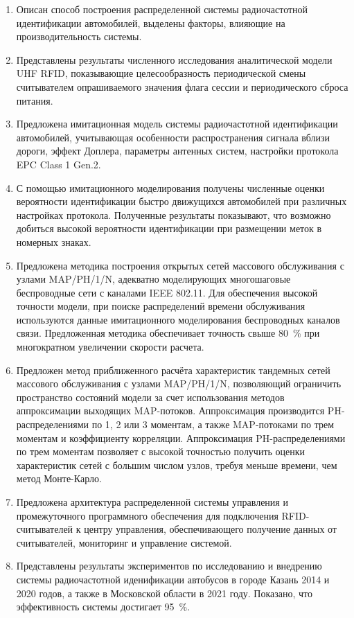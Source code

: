 \begin{enumerate}
  \item Описан способ построения распределенной системы радиочастотной идентификации автомобилей, выделены факторы, влияющие на производительность системы.
  \item Представлены результаты численного исследования аналитической модели UHF RFID, показывающие целесообразность периодической смены считывателем опрашиваемого значения флага сессии и периодического сброса питания.
  \item Предложена имитационная модель системы радиочастотной идентификации автомобилей, учитывающая особенности распространения сигнала вблизи дороги, эффект Доплера, параметры антенных систем, настройки протокола EPC Class 1 Gen.2.
  \item С помощью имитационного моделирования получены численные оценки вероятности идентификации быстро движущихся автомобилей при различных настройках протокола. Полученные результаты показывают, что возможно добиться высокой вероятности идентификации при размещении меток в номерных знаках.
  \item Предложена методика построения открытых сетей массового обслуживания с узлами MAP/PH/1/N, адекватно моделирующих многошаговые беспроводные сети с каналами IEEE 802.11. Для обеспечения высокой точности модели, при поиске распределений времени обслуживания используются данные имитационного моделирования беспроводных каналов связи. Предложенная методика обеспечивает точность свыше 80~\% при многократном увеличении скорости расчета.
  \item Предложен метод приближенного расчёта характеристик тандемных сетей массового обслуживания с узлами MAP/PH/1/N,   позволяющий ограничить пространство состояний модели за счет использования методов аппроксимации выходящих MAP-потоков. Аппроксимация производится PH-распределениями по 1, 2 или 3 моментам, а также MAP-потоками по трем моментам и коэффициенту корреляции. Аппроксимация PH-распределениями по трем моментам позволяет с высокой точностью получить оценки характеристик сетей с большим числом узлов, требуя меньше времени, чем метод Монте-Карло.
  \item Предложена архитектура распределенной системы управления и промежуточного программного обеспечения для подключения RFID-считывателей к центру управления, обеспечивающего получение данных от считывателей, мониторинг и управление системой.
  \item Представлены результаты экспериментов по исследованию и внедрению системы радиочастотной иденификации автобусов в городе Казань 2014 и 2020 годов, а также в Московской области в 2021 году. Показано, что эффективность системы достигает 95~\%.
\end{enumerate}
